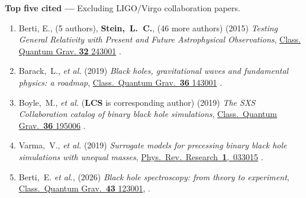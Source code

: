 {\bf Top five cited ---}%
Excluding LIGO/Virgo collaboration papers.
\begin{enumerate}
\item
  Berti, E., (5 authors), {\bf Stein,~L.~C.}, (46 more authors)
  (2015)
  {\it Testing General Relativity with Present and Future
    Astrophysical Observations},
  \href{http://dx.doi.org/10.1088/0264-9381/32/24/243001}{Class. Quantum Grav. {\bf 32} 243001}
  .
\item
  Barack,~L., {\it et al.}
  (2019)
  {\it Black holes, gravitational waves and fundamental physics: a roadmap},
  \href{https://doi.org/10.1088/1361-6382/ab0587}{Class.~Quantum Grav.~{\bf 36} 143001}
  .
\item
  Boyle,~M., {\it et al.} ({\bf LCS} is corresponding author)
  (2019)
  {\it The SXS Collaboration catalog of binary black hole simulations},
  \href{https://doi.org/10.1088/1361-6382/ab34e2}{Class.~Quantum Grav.~{\bf 36} 195006}
  .
\item
  Varma,~V., {\it et al.}
  (2019)
  {\it Surrogate models for precessing binary black hole simulations with
  unequal masses},
  \href{https://doi.org/10.1103/PhysRevResearch.1.033015}{Phys.~Rev.~Research~{\bf 1},~033015}
  .
\item
  Berti,~E.
  {\it et al.},
  (2026)
  {\it Black hole spectroscopy: from theory to experiment},
  \href{https://doi.org/10.1088/1361-6382/ae59e2}%
  {Class.~Quantum Grav.~{\bf 43} 123001},
  .
\end{enumerate}
\else%
\fi

\renewcommand{\citeCount}[1]{}

